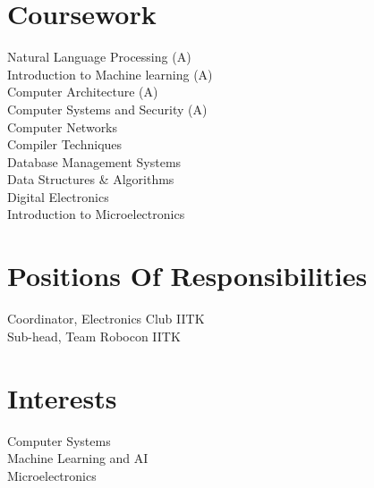 \documentclass[]{deedy-resume-openfont}
\begin{document}
\begin{minipage}[t]{0.30\textwidth}
\section{Coursework}
\textbullet{} Natural Language Processing (A)\\
\textbullet{} Introduction to  Machine learning (A)\\
\textbullet{} Computer Architecture (A)\\
\textbullet{} Computer Systems and Security (A)\\
\textbullet{} Computer Networks\\
\textbullet{} Compiler Techniques \\
\textbullet{} Database Management Systems \\
\textbullet{} Data Structures \& Algorithms \\
\textbullet{} Digital Electronics\\
\textbullet{} Introduction to Microelectronics\\
\sectionsep

\section{Positions Of Responsibilities}
\textbullet{} Coordinator, Electronics Club IITK\\
\hspace{1.5cm}
\textbullet{} Sub-head, Team Robocon IITK\\
\hspace{1.5cm}
\sectionsep


\section{Interests}
\textbullet{} Computer Systems\\
\textbullet{} Machine Learning and AI\\
\textbullet{} Microelectronics
\sectionsep



\end{minipage} 
\hfill
\end{document}
